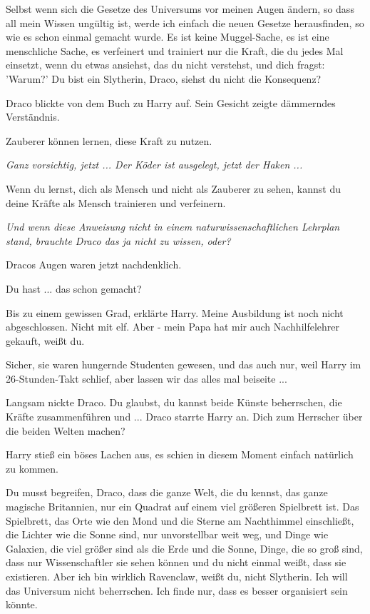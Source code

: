 Selbst wenn sich die Gesetze des Universums vor meinen Augen ändern, so dass all
mein Wissen ungültig ist, werde ich einfach die neuen Gesetze herausfinden, so
wie es schon einmal gemacht wurde. Es ist keine Muggel-Sache, es ist eine
menschliche Sache, es verfeinert und trainiert nur die Kraft, die du jedes Mal
einsetzt, wenn du etwas ansiehst, das du nicht verstehst, und dich fragst:
'Warum?' Du bist ein Slytherin, Draco, siehst du nicht die Konsequenz?\grqq{}

Draco blickte von dem Buch zu Harry auf. Sein Gesicht zeigte dämmerndes
Verständnis.

\glqq{}Zauberer können lernen, diese Kraft zu nutzen.\grqq{}

\emph{Ganz vorsichtig, jetzt ... Der Köder ist ausgelegt, jetzt der Haken ...}

\glqq{}Wenn du lernst, dich als Mensch und nicht als Zauberer zu sehen, kannst
du deine Kräfte als Mensch trainieren und verfeinern.\grqq{}

\emph{Und wenn diese Anweisung nicht in einem naturwissenschaftlichen Lehrplan
stand, brauchte Draco das ja nicht zu wissen, oder?}

Dracos Augen waren jetzt nachdenklich.

\glqq{}Du hast ... das schon gemacht?\grqq{}

\glqq{}Bis zu einem gewissen Grad\grqq{}, erklärte Harry. \glqq{}Meine
Ausbildung ist noch nicht abgeschlossen. Nicht mit elf. Aber - mein Papa hat
mir auch Nachhilfelehrer gekauft, weißt du.\grqq{}

Sicher, sie waren hungernde Studenten gewesen, und das auch nur, weil Harry im
26-Stunden-Takt schlief, aber lassen wir das alles mal beiseite ...

Langsam nickte Draco. \glqq{}Du glaubst, du kannst beide Künste beherrschen, die
Kräfte zusammenführen und ...\grqq{} Draco starrte Harry an. \glqq{}Dich zum
Herrscher über die beiden Welten machen?\grqq{}

Harry stieß ein böses Lachen aus, es schien in diesem Moment einfach natürlich
zu kommen.

\glqq{}Du musst begreifen, Draco, dass die ganze Welt, die du kennst, das ganze
magische Britannien, nur ein Quadrat auf einem viel größeren Spielbrett ist. Das
Spielbrett, das Orte wie den Mond und die Sterne am Nachthimmel einschließt, die
Lichter wie die Sonne sind, nur unvorstellbar weit weg, und Dinge wie Galaxien,
die viel größer sind als die Erde und die Sonne, Dinge, die so groß sind, dass
nur Wissenschaftler sie sehen können und du nicht einmal weißt, dass sie
existieren. Aber ich bin wirklich Ravenclaw, weißt du, nicht Slytherin. Ich will
das Universum nicht beherrschen. Ich finde nur, dass es besser organisiert sein
könnte.\grqq{}

